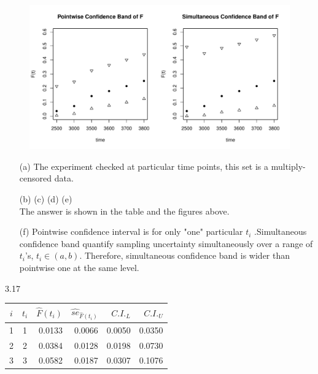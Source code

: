 \documentclass[paper=a4, fontsize=11pt]{scrartcl} %
\numberwithin{equation}{section} %
\numberwithin{figure}{section} %
\numberwithin{table}{section} %
\begin{document}
		\begin{figure}[h]
			\includegraphics[width = 6 in]{3_12_de.pdf}
		\end{figure}		

\begin{itemize}

	\item[(a)]{
		The experiment checked at particular time points, this set is a multiply-censored data. 
	}
	\item[(b)]{(c) (d) (e)\\
		The answer is shown in the table and the figures above.		
	}
	\item[(f)]{
		Pointwise confidence interval is for only "one" particular $t_i$ .Simultaneous confidence band quantify sampling uncertainty simultaneously over a range of  $t_i$'s, $t_i \in (a, b)$. Therefore, simultaneous confidence band is wider than pointwise one at the same level.
	}
	
\end{itemize}

\newpage
3.17
		\begin{table}[h]
			\begin{center}
			\begin{tabular}{ccrrrr}
				$i$  	& 	$t_i$ 	&  	$\widehat{F}(t_i)$ & 
				$\widehat{se}_{\widehat{F}(t_i)}$  & $C.I._L$ & $C.I._U$ \\ \hline
				1  &1 &0.0133 &0.0066 &0.0050 &0.0350 \\
				2  &2 &0.0384 &0.0128 &0.0198 &0.0730 \\
				3  &3 &0.0582 &0.0187 &0.0307 &0.1076

			\end{tabular}
			\end{center}
		\end{table}
\end{document}
